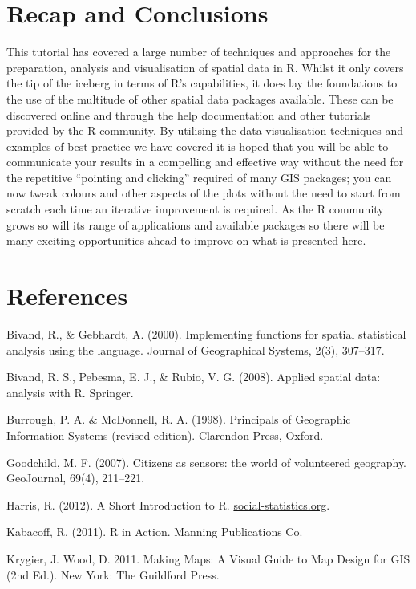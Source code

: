 \documentclass[]{article}
\begin{document}
\section{Recap and Conclusions}

This tutorial has covered a large number of techniques and approaches
for the preparation, analysis and visualisation of spatial data in R.
Whilst it only covers the tip of the iceberg in terms of R's
capabilities, it does lay the foundations to the use of the multitude of
other spatial data packages available. These can be discovered online
and through the help documentation and other tutorials provided by the R
community. By utilising the data visualisation techniques and examples
of best practice we have covered it is hoped that you will be able to
communicate your results in a compelling and effective way without the
need for the repetitive ``pointing and clicking'' required of many GIS
packages; you can now tweak colours and other aspects of the plots
without the need to start from scratch each time an iterative
improvement is required. As the R community grows so will its range of
applications and available packages so there will be many exciting
opportunities ahead to improve on what is presented here.

\section{References}

Bivand, R., \& Gebhardt, A. (2000). Implementing functions for spatial
statistical analysis using the language. Journal of Geographical
Systems, 2(3), 307--317.

Bivand, R. S., Pebesma, E. J., \& Rubio, V. G. (2008). Applied spatial
data: analysis with R. Springer.

Burrough, P. A. \& McDonnell, R. A. (1998). Principals of Geographic
Information Systems (revised edition). Clarendon Press, Oxford.

Goodchild, M. F. (2007). Citizens as sensors: the world of volunteered
geography. GeoJournal, 69(4), 211--221.

Harris, R. (2012). A Short Introduction to R.
\href{http://www.social-statistics.org/}{social-statistics.org}.

Kabacoff, R. (2011). R in Action. Manning Publications Co.

Krygier, J. Wood, D. 2011. Making Maps: A Visual Guide to Map Design for
GIS (2nd Ed.). New York: The Guildford Press.
\end{document}
